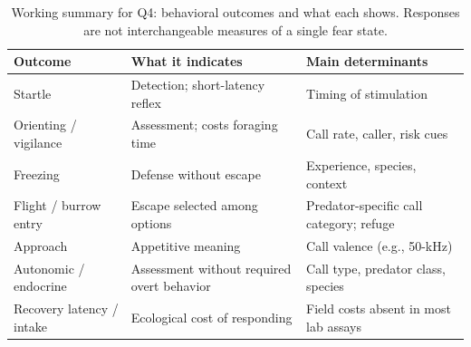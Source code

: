 \begin{table}[tbp]
\centering
\footnotesize
\singlespacing
\caption{Working summary for Q4: behavioral outcomes and what each shows. Responses are not interchangeable measures of a single fear state.}
\label{tab:summary-q4}
\begin{tabular}{@{}p{1.15in}p{3.5in}p{1.55in}@{}}
\toprule
\textbf{Outcome} & \textbf{What it indicates} & \textbf{Main determinants} \\
\midrule
Startle & Detection; short-latency reflex & Timing of stimulation \\
\addlinespace[2pt]
Orienting / vigilance & Assessment; costs foraging time & Call rate, caller, risk cues \\
\addlinespace[2pt]
Freezing & Defense without escape & Experience, species, context \\
\addlinespace[2pt]
Flight / burrow entry & Escape selected among options & Predator-specific call category; refuge \\
\addlinespace[2pt]
Approach & Appetitive meaning & Call valence (e.g., 50-kHz) \\
\addlinespace[2pt]
Autonomic / endocrine & Assessment without required overt behavior & Call type, predator class, species \\
\addlinespace[2pt]
Recovery latency / intake & Ecological cost of responding & Field costs absent in most lab assays \\
\bottomrule
\end{tabular}
\end{table}

